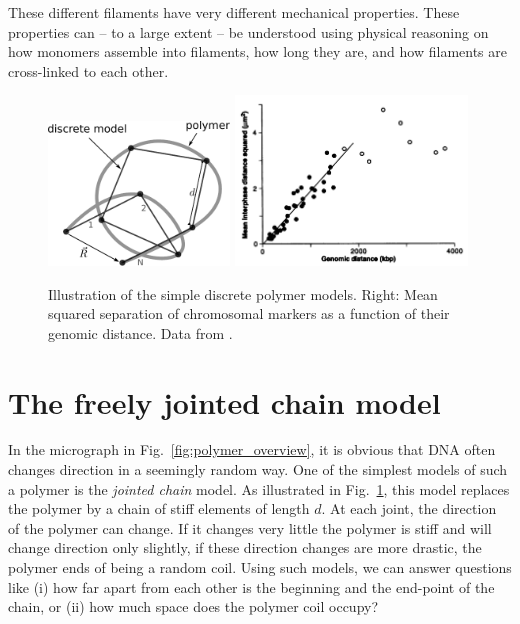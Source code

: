 These different filaments have very different mechanical properties.
These properties can -- to a large extent -- be understood using physical reasoning on how monomers assemble into filaments, how long they are, and how filaments are cross-linked to each other.

\begin{figure}[tb]
	\centering
	\includegraphics[width=0.43\textwidth]{figures/jointed_chain.pdf}
	\includegraphics[width=0.55\textwidth]{figures/Genome_conformation_van_den_Engh.png}
	\caption{Illustration of the simple discrete polymer models.
	Right: Mean squared separation of chromosomal markers as a function of their genomic distance. Data from \citet{engh_estimating_1992}.}
	\label{fig:polymer_models}
\end{figure}

\section{The freely jointed chain model}
In the micrograph in Fig.~\ref{fig:polymer_overview}, it is obvious that DNA often changes direction in a seemingly random way.
One of the simplest models of such a polymer is the \emph{jointed chain} model.
As illustrated in Fig.~\ref{fig:polymer_models}, this model replaces the polymer by a chain of stiff elements of length $d$.
At each joint, the direction of the polymer can change.
If it changes very little the polymer is stiff and will change direction only slightly, if these direction changes are more drastic, the polymer ends of being a random coil.
Using such models, we can answer questions like (i) how far apart from each other is the beginning and the end-point of the chain, or (ii) how much space does the polymer coil occupy?

